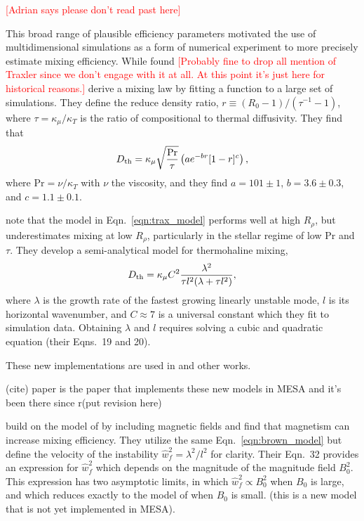\textcolor{red}{[Adrian says please don't read past here]}

This broad range of plausible efficiency parameters motivated the use of multidimensional simulations as a form of numerical experiment to more precisely estimate mixing efficiency. 
While \citet{charbonnel_thermohaline_2007} found 
\textcolor{red}{[Probably fine to drop all mention of Traxler since we don't engage with it at all. At this point it's just here for historical reasons.]} 
\citet{traxler_etal_2011} derive a mixing law by fitting a function to a large set of simulations.
They define the reduce density ratio, $r \equiv (R_0 - 1)/(\tau^{-1} - 1)$, where $\tau = \kappa_\mu/\kappa_T$ is the ratio of compositional to thermal diffusivity.
They find that
\begin{equation} \label{eqn:trax_model}
   \Dth = \kappa_{\mu}\sqrt{\frac{\mathrm{Pr}}{\tau}}\left(a e^{-br}[1 - r]^c\right),
\end{equation}
where $\mathrm{Pr} = \nu / \kappa_T$ with $\nu$ the viscosity, and they find $a = 101 \pm 1$, $b = 3.6 \pm 0.3$, and $c = 1.1 \pm 0.1$.



\citet{brown_etal_2013} note that the model in Eqn.~\ref{eqn:trax_model} performs well at high $R_\rho$, but underestimates mixing at low $R_\rho$, particularly in the stellar regime of low Pr and $\tau$.
They develop a semi-analytical model for thermohaline mixing,
\begin{equation}
    \Dth = \kappa_{\mu}C^2\frac{\lambda^2}{\tau l^2(\lambda + \tau l^2)},
    \label{eqn:brown_model}
\end{equation}
where $\lambda$ is the growth rate of the fastest growing linearly unstable mode, $l$ is its horizontal wavenumber, and $C \approx 7$ is a universal constant which they fit to simulation data.
Obtaining $\lambda$ and $l$ requires solving a cubic and quadratic equation (their Eqns.~19 and 20).

These new implementations are used in \citep{bauer_bildsten_2019} and other works.

(cite) paper is the paper that implements these new models in MESA and it's been there since r(put revision here)


\citet{harrington} build on the model of \citet{brown_etal_2013} by including magnetic fields and find that magnetism can increase mixing efficiency.
They utilize the same Eqn.~\ref{eqn:brown_model} but define the velocity of the instability $\hat{w}_f^2 = \lambda^2/l^2$ for clarity. 
Their Eqn.~32 provides an expression for $\hat{w}_f^2$ which depends on the magnitude of the magnitude field $B_0^2$.
This expression has two asymptotic limits, in which $\hat{w}_f^2 \propto B_0^2$ when $B_0$ is large, and which reduces exactly to the model of \citet{brown_etal_2013} when $B_0$ is small.
(this is a new model that is not yet implemented in MESA).


